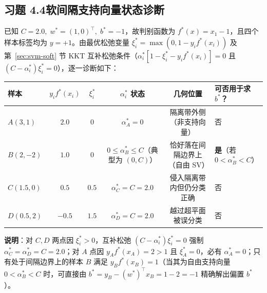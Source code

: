 \subsection*{习题 4.4\quad 软间隔支持向量状态诊断}
已知 $C = 2.0,\; w^* = (1, 0)^\top,\; b^* = -1$，故判别函数为 $f^*(x) = x_1 - 1$，且四个样本标签均为 $y = +1$。由最优松弛变量 $\xi_i^* = \max(0, 1 - y_i f^*(x_i))$ 及第~\ref{sec:svm-soft} 节 KKT 互补松弛条件（$\alpha_i^*[1 - \xi_i^* - y_i f^*(x_i)] = 0$ 且 $(C - \alpha_i^*)\xi_i^* = 0$），逐一诊断如下：
\begin{center}\small
\begin{tabular}{@{}lccccl@{}}
  \toprule
  \textbf{样本} & $y_i f^*(x_i)$ & $\xi_i^*$ & $\alpha_i^*$ \textbf{状态} & \textbf{几何位置} & \textbf{可否用于求 $b^*$？} \\
  \midrule
  $A(3, 1)$ & $2.0$ & $0$ & $\alpha_A^* = 0$ & 隔离带外侧（非支持向量） & 否 \\
  $B(2, -2)$ & $1.0$ & $0$ & $0 \le \alpha_B^* \le C$（典型为 $(0, C)$） & 恰好落在间隔边界上（自由 SV） & \textbf{是}（若 $0 < \alpha_B^* < C$） \\
  $C(1.5, 0)$ & $0.5$ & $0.5$ & $\alpha_C^* = C = 2.0$ & 侵入隔离带内但仍分类正确 & 否 \\
  $D(0.5, 2)$ & $-0.5$ & $1.5$ & $\alpha_D^* = C = 2.0$ & 越过超平面被误分类 & 否 \\
  \bottomrule
\end{tabular}
\end{center}
\textbf{说明}：对 $C, D$ 两点因 $\xi_i^* > 0$，互补松弛 $(C - \alpha_i^*)\xi_i^* = 0$ 强制 $\alpha_C^* = \alpha_D^* = C = 2.0$；对 $A$ 点因 $y_A f^*(x_A) = 2 > 1$ 且 $\xi_A^* = 0$，必有 $\alpha_A^* = 0$；只有处于间隔边界上的样本 $B$ 满足 $y_B f^*(x_B) = 1$（当其为自由支持向量 $0 < \alpha_B^* < C$ 时，可直接由 $b^* = y_B - (w^*)^\top x_B = 1 - 2 = -1$ 精确解出偏置 $b^*$）。

